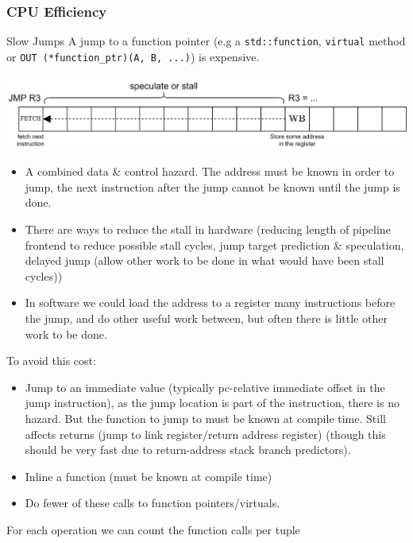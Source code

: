 \subsubsection{CPU Efficiency}
\begin{sidenotebox}{Slow Jumps}
  A jump to a function pointer (e.g a \texttt{std::function}, \texttt{virtual} method or \texttt{OUT (*function_ptr)(A, B, ...)}) is expensive.
  \begin{center}
    \includegraphics[width=.8\textwidth]{processing_models/images/jump_to_register.drawio.png}
  \end{center}
  \begin{itemize}
    \item A combined data \& control hazard. The address must be known in order to jump, the next instruction after the jump cannot be known until the jump is done.
    \item There are ways to reduce the stall in hardware (reducing length of pipeline frontend to reduce possible stall cycles, jump target prediction \& speculation, delayed jump (allow other work to be done in what would have been stall cycles))
    \item In software we could load the address to a register many instructions before the jump, and do other useful work between, but often there is little other work to be done.
  \end{itemize}
  To avoid this cost:
  \begin{itemize}
    \item Jump to an immediate value (typically pc-relative immediate offset in the jump instruction), as the jump location is part of the instruction, there is no hazard. But the function to jump to must be known at compile time. Still affects returns (jump to link register/return address register) (though this should be very fast due to return-address stack branch predictors).
    \item Inline a function (must be known at compile time)
    \item Do fewer of these calls to function pointers/virtuals.
  \end{itemize}
\end{sidenotebox}
For each operation we can count the function calls per tuple
